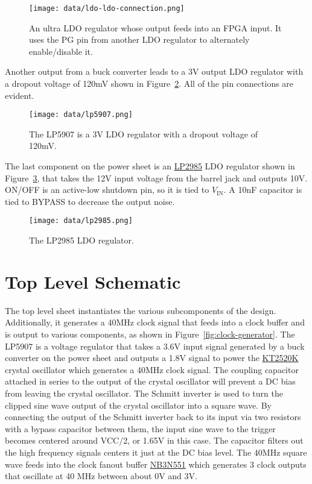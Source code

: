 \documentclass{default}
\begin{document}
\begin{figure}[h]
  \centering
  \texttt{[image: data/ldo-ldo-connection.png]}
  \caption{An ultra LDO regulator whose output feeds into an FPGA input. It uses the PG
    pin from another LDO regulator to alternately enable/disable it.}
  \label{fig:ldo-ldo-connection}
\end{figure}

Another output from a buck converter leads to a 3V output LDO regulator with a dropout voltage of
120mV shown in Figure~\ref{fig:lp5907}. All of the pin connections are evident.

\begin{figure}[h]
  \centering
  \texttt{[image: data/lp5907.png]}
  \caption{The LP5907 is a 3V LDO regulator with a dropout voltage of 120mV.}
  \label{fig:lp5907}
\end{figure}

The last component on the power sheet is an
\href{http://www.ti.com/lit/ds/symlink/lp2985.pdf}{LP2985} LDO regulator shown in
Figure~\ref{fig:lp2985}, that takes the 12V input voltage from the barrel jack and outputs
10V. ON/OFF is an active-low shutdown pin, so it is tied to $V_{\text{IN}}$. A 10nF capacitor is
tied to BYPASS to decrease the output noise.

\begin{figure}[h]
  \centering
  \texttt{[image: data/lp2985.png]}
  \caption{The LP2985 LDO regulator.}
  \label{fig:lp2985}
\end{figure}

\section{Top Level Schematic}

The top level sheet instantiates the various subcomponents of the design. Additionally, it generates
a 40MHz clock signal that feeds into a clock buffer and is output to various components, as shown in
Figure~\ref{fig:clock-generator}. The LP5907 is a voltage regulator that takes a 3.6V input signal
generated by a buck converter on the power sheet and outputs a 1.8V signal to power the
\href{https://media.digikey.com/pdf/Data\%20Sheets/AVX\%20PDFs/KT2520K40000DAW18TAS_Spec.pdf}{KT2520K}
crystal oscillator which generates a 40MHz clock signal. The coupling capacitor attached in series to
the output of the crystal oscillator will prevent a DC bias from leaving the crystal oscillator. The
Schmitt inverter is used to turn the clipped sine wave output of the crystal oscillator into a
square wave. By connecting the output of the Schmitt inverter back to its input via two resistors
with a bypass capacitor between them, the input sine wave to the trigger becomes centered around
VCC/2, or 1.65V in this case. The capacitor filters out the high frequency signals centers it just at
the DC bias level. The 40MHz square wave feeds into the clock fanout buffer
\href{http://www.onsemi.com/pub/Collateral/NB3N551-D.PDF}{NB3N551} which generates 3 clock outputs
that oscillate at 40 MHz between about 0V and 3V.
\end{document}
